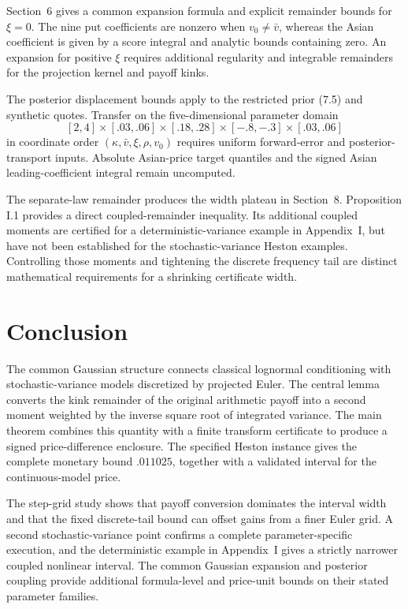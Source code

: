 \documentclass[11pt,a4paper]{article}
\begin{document}
Section~6 gives a common expansion formula and explicit remainder bounds for
\(\xi=0\). The nine put coefficients are nonzero when \(v_0\ne\bar v\),
whereas the Asian coefficient is given by a score integral and analytic bounds
containing zero. An expansion for positive \(\xi\) requires additional regularity
and integrable remainders for the projection kernel and payoff kinks.

The posterior displacement bounds apply to the restricted prior (7.5) and
synthetic quotes. Transfer on the five-dimensional parameter domain
\[
[2,4]\times[.03,.06]\times[.18,.28]\times[-.8,-.3]\times[.03,.06]
\]
in coordinate order \((\kappa,\bar v,\xi,\rho,v_0)\) requires uniform forward-error and posterior-transport inputs. Absolute
Asian-price target quantiles and the signed Asian leading-coefficient integral
remain uncomputed.

The separate-law remainder produces the width plateau in Section~8. Proposition
I.1 provides a direct coupled-remainder inequality. Its additional coupled
moments are certified for a deterministic-variance example in Appendix~I,
but have not been established for the stochastic-variance Heston examples. Controlling those
moments and tightening the discrete frequency tail are distinct mathematical
requirements for a shrinking certificate width.

\section{Conclusion}

The common Gaussian structure connects classical lognormal conditioning with
stochastic-variance models discretized by projected Euler.
The central lemma converts the kink remainder of the original arithmetic payoff into
a second moment weighted by the inverse square root of integrated variance. The main theorem combines this
quantity with a finite transform certificate to produce a signed price-difference enclosure.
The specified Heston instance gives the complete monetary bound \(.011025\), together
with a validated interval for the continuous-model price.

The step-grid study shows that payoff conversion dominates the interval width
and that the fixed discrete-tail bound can offset gains from a finer Euler grid.
A second stochastic-variance point confirms a complete parameter-specific
execution, and the deterministic example in Appendix~I gives a strictly narrower
coupled nonlinear interval. The common Gaussian expansion and posterior coupling provide additional
formula-level and price-unit bounds on their stated parameter families.
\end{document}
